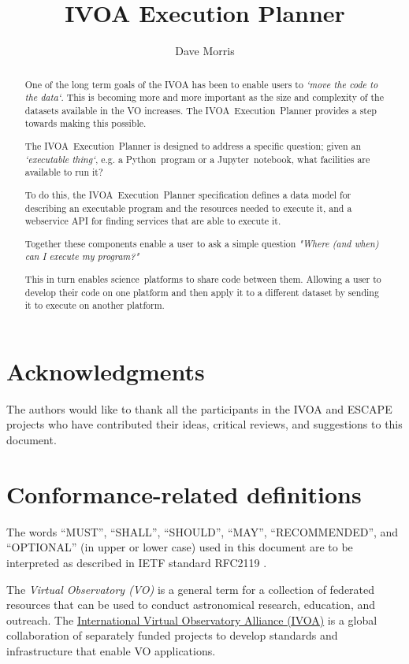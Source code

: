 \documentclass[11pt,a4paper]{ivoa}
\title{IVOA Execution Planner}
\author[http://www.ivoa.net/twiki/bin/view/IVOA/DaveMorris]
       {Dave Morris}
\newcommand{\webservice} {webservice\xspace}
\newcommand{\ivoaexecplanner} {IVOA~Execution~Planner\xspace}
\newcommand{\jupyternotebook} {Jupyter~notebook\xspace}
\newcommand{\pythonprogram} {Python~program\xspace}
\newcommand{\dataset} {dataset\xspace}
\newcommand{\scienceplatform} {science~platform\xspace}
\begin{document}
\begin{abstract}

One of the long term goals of the IVOA has been to enable users to
\textit{`move the code to the data`}.
This is becoming more and more important as the size and complexity
of the \dataset{}s available in the VO increases.
The \ivoaexecplanner provides a step towards making this possible.

The \ivoaexecplanner is designed to address a specific question;
given an \textit{`executable thing`}, e.g. a \pythonprogram or a \jupyternotebook,
what facilities are available to run it?

To do this, the \ivoaexecplanner specification defines
a data model for describing an executable program
and the resources needed to execute it,
and a \webservice API for finding services
that are able to execute it.

Together these components enable a user to ask a simple question
\textit{"Where (and when) can I execute my program?"}

This in turn enables \scienceplatform{}s to share code between them.
Allowing a user to develop their code on one platform and then apply it to a different
\dataset by sending it to execute on another platform.

\end{abstract}

\section*{Acknowledgments}

The authors would like to thank all the participants in the IVOA and ESCAPE projects
who have contributed their ideas, critical reviews, and suggestions to this document.

\section*{Conformance-related definitions}

The words ``MUST'', ``SHALL'', ``SHOULD'', ``MAY'', ``RECOMMENDED'', and
``OPTIONAL'' (in upper or lower case) used in this document are to be
interpreted as described in IETF standard RFC2119 \citep{std:RFC2119}.

The \emph{Virtual Observatory (VO)} is a general term for a collection of
federated resources that can be used to conduct astronomical research,
education, and outreach.
The \href{https://www.ivoa.net}{International Virtual Observatory Alliance (IVOA)}
is a global collaboration of separately funded projects to develop standards and
infrastructure that enable VO applications.
\end{document}
